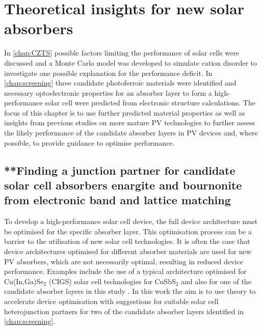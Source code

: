 \documentclass[11pt, twoside]{report}
\begin{document}
\chapter{Theoretical insights for new solar absorbers}\label{chap:insights}

In \autoref{chap:CZTS} possible factors limiting the performance of {\CZTS} solar cells were discussed and a Monte Carlo model was developed to simulate cation disorder to investigate one possible explanation for the performance deficit. In \autoref{chap:screening} three candidate photoferroic materials were identified and necessary optoelectronic properties for an absorber layer to form a high-performance solar cell were predicted from electronic structure calculations. The focus of this chapter is to use further predicted material properties as well as insights from previous studies on more mature PV technologies to further assess the likely performance of the candidate absorber layers in PV devices and, where possible, to provide guidance to optimise performance.


\section{**Finding a junction partner for candidate solar cell absorbers enargite and bournonite from electronic band and lattice matching}\label{sulfosalt_band_alignment}

To develop a high-performance solar cell device, the full device architecture must be optimised for the specific absorber layer. This optimisation process can be a barrier to the utilisation of new solar cell technologies. It is often the case that device architectures optimised for different absorber materials are used for new PV absorbers, which are not necessarily optimal, resulting in reduced device performance. Examples include the use of a typical architecture optimised for Cu(In,Ga)Se$_2$ (CIGS) solar cell technologies for CuSbS$_2$ \cite{CAS_alignment} and also for one of the candidate absorber layers in this study {\enargite} \cite{enargite_SC}. In this work the aim is to use theory to accelerate device optimisation with suggestions for suitable solar cell heterojunction partners for two of the candidate absorber layers identified in \autoref{chap:screening}. 
\end{document}

